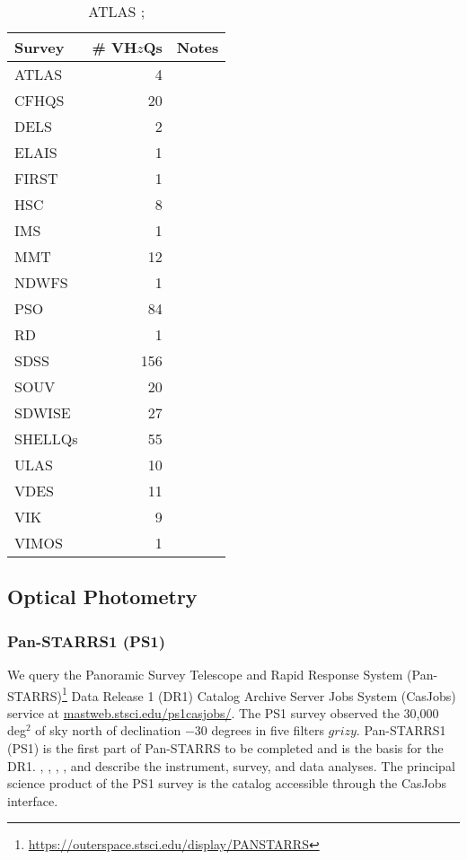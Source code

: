 \documentclass[usenatbib]{mnras}
\begin{document}
\begin{table}
\begin{tabular}{l r l}
\hline  \hline
Survey   & \# VH$z$Qs & Notes  \\
\hline  
  ATLAS      &    4    &  \\
  CFHQS     &  20    &  \\
  DELS        &    2    &  \\
  ELAIS       &    1    &  \\
  FIRST       &    1    &  \\
  HSC         &    8    &  \\
  IMS          &   1     &  \\
  MMT        &  12    &  \\
  NDWFS    &  1      &  \\
  PSO          &    84  & \\
  RD           &  1       & \\
  SDSS        & 156       & \\
  SOUV       & 20       & \\
  SDWISE    & 27& \\
  SHELLQs  & 55 & \\
  ULAS       & 10& \\
  VDES       & 11& \\
  VIK          & 9 &\\
  VIMOS     & 1& \\
\hline  \hline
\end{tabular}
\caption{ATLAS \citet{Shanks2015}; }
      \label{tab:surveys}
\end{table}

        
\subsection{Optical Photometry}
    \subsubsection{Pan-STARRS1 (PS1)} 
    We query the Panoramic Survey Telescope and Rapid Response System
    (Pan-STARRS)\footnote{\href{https://outerspace.stsci.edu/display/PANSTARRS}{https://outerspace.stsci.edu/display/PANSTARRS}}
    Data Release 1 (DR1) Catalog Archive Server Jobs System (CasJobs)
    service at
    \href{http://mastweb.stsci.edu/ps1casjobs/}{mastweb.stsci.edu/ps1casjobs/}.
    The PS1 survey observed the 30,000 deg$^{2}$ of sky north of
    declination $-30$ degrees in five filters $grizy$.  Pan-STARRS1 (PS1)
    is the first part of Pan-STARRS to be completed and is the basis for
    the DR1.  \citet{Chambers2016}, \citet{Magnier2016a},
    \citet{Waters2016}, \citet{Magnier2016b}, \citet{Magnier2016c} and
    \citet{Flewelling2016} describe the instrument, survey, and data
    analyses.  The principal science product of the PS1 survey is the
    catalog accessible through the CasJobs interface.
    
\end{document}
